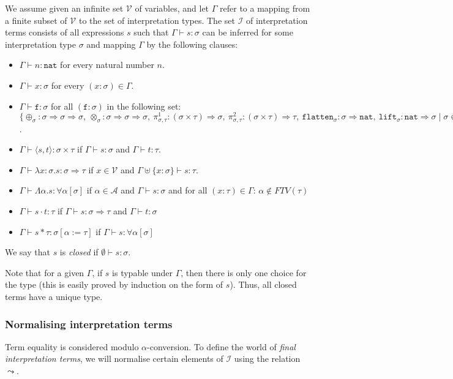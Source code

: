 \documentclass[runningheads,a4paper]{llncs}
\newcommand{\Iterms}{\mathcal{I}}
\newcommand{\Typevars}{\mathcal{A}}
\newcommand{\Vars}{\mathcal{V}}
\newcommand{\ITypes}{\mathcal{Y}}
\newcommand{\quant}[2]{\forall #1[#2]}
\newcommand{\arrtype}{\Rightarrow}
\newcommand{\abs}[2]{\lambda #1.#2}
\newcommand{\tabs}[2]{\Lambda #1.#2}
\newcommand{\app}[2]{#1 \cdot #2}
\newcommand{\tapp}[2]{#1 * #2}
\newcommand{\pair}[2]{\langle #1,#2 \rangle}
\newcommand{\subst}[2]{#1:=#2}
\newcommand{\FTV}{\mathit{FTV}}
\newcommand{\nat}{\mathtt{nat}}
\newcommand{\proj}{\pi}
\newcommand{\flatten}{\mathtt{flatten}}
\newcommand{\lift}{\mathtt{lift}}
\begin{document}
\begin{definition}\label{def_typing}
We assume given an infinite set $\Vars$ of variables, and let $\Gamma$
refer to a mapping from a finite subset of $\Vars$ to the set of
interpretation types.  The set $\Iterms$ of interpretation terms consists
of all expressions $s$ such that $\Gamma \vdash s : \sigma$ can be
inferred for some interpretation type $\sigma$ and mapping $\Gamma$ by
the following clauses:
\begin{itemize}
\item $\Gamma \vdash n : \nat$ for every natural number $n$.
\item $\Gamma \vdash x : \sigma$ for every $(x : \sigma) \in \Gamma$.
\item $\Gamma \vdash \mathtt{f} : \sigma$ for all $(\mathtt{f} :
  \sigma)$ in the following set: $\{ \oplus_\sigma : \sigma \arrtype
  \sigma \arrtype \sigma,\ \otimes_\sigma : \sigma \arrtype \sigma \arrtype
  \sigma,\ \proj^1_{\sigma,\tau} : (\sigma \times \tau) \arrtype
  \sigma,\ \proj^2_{\sigma,\tau} : (\sigma \times \tau) \arrtype \tau,\ 
  \flatten_{\sigma} : \sigma \arrtype \nat,\ 
  \lift_{\sigma} : \nat \arrtype \sigma
  \mid \sigma \in \ITypes \}$.
\item $\Gamma \vdash \pair{s}{t} : \sigma \times \tau$ if $\Gamma \vdash
  s : \sigma$ and $\Gamma \vdash t : \tau$.
\item $\Gamma \vdash \abs{x:\sigma}{s} : \sigma \arrtype \tau$ if $x
  \in \Vars$ and $\Gamma \uplus \{ x : \sigma \} \vdash s : \tau$.
\item $\Gamma \vdash \tabs{\alpha}{s} : \quant{\alpha}{\sigma}$ if
  $\alpha \in \Typevars$ and $\Gamma \vdash s : \sigma$ and for all
  $(x : \tau) \in \Gamma$: $\alpha \notin \FTV(\tau)$
\item $\Gamma \vdash \app{s}{t} : \tau$ if $\Gamma \vdash s :
  \sigma \arrtype \tau$ and $\Gamma \vdash t : \sigma$
\item $\Gamma \vdash \tapp{s}{\tau} : \sigma[\subst{\alpha}{\tau}]$ if
  $\Gamma \vdash s : \quant{\alpha}{\sigma}$
\end{itemize}
We say that $s$ is \emph{closed} if $\emptyset \vdash s : \sigma$.
\end{definition}

Note that for a given $\Gamma$, if $s$ is typable under $\Gamma$, then
there is only one choice for the type (this is easily proved by
induction on the form of $s$). Thus, all closed terms have a unique
type.

\subsubsection{Normalising interpretation terms}
Term equality is considered modulo $\alpha$-conversion. To define the
world of \emph{final interpretation terms}, we will normalise certain
elements of $\Iterms$ using the relation $\leadsto$.
\end{document}
